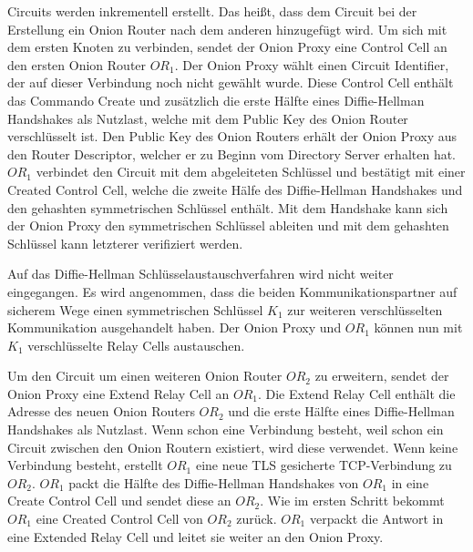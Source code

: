 \documentclass[fleqn,envcountsame,runningheads,10pt,a4paper]{llncs}
\begin{document}
Circuits werden inkrementell erstellt. Das heißt, dass dem Circuit bei der 
Erstellung ein Onion Router nach dem anderen hinzugefügt wird. Um sich mit dem 
ersten Knoten zu verbinden, sendet der Onion Proxy eine Control Cell an den 
ersten Onion Router $\textit{OR}_1$. Der Onion Proxy wählt einen Circuit 
Identifier, der auf dieser Verbindung noch nicht gewählt wurde. Diese Control 
Cell enthält das Commando Create und zusätzlich die erste Hälfte eines 
Diffie-Hellman Handshakes als Nutzlast, welche mit dem Public Key des Onion 
Router verschlüsselt ist. Den Public Key des Onion Routers erhält der Onion 
Proxy aus den Router Descriptor, welcher er zu Beginn vom Directory Server 
erhalten hat. $\textit{OR}_1$ verbindet den Circuit mit dem abgeleiteten 
Schlüssel und  bestätigt mit einer Created Control Cell, welche die zweite Hälfe 
des Diffie-Hellman Handshakes und den gehashten symmetrischen Schlüssel enthält. 
Mit dem Handshake kann sich der Onion Proxy den symmetrischen Schlüssel ableiten 
und mit dem gehashten Schlüssel kann letzterer verifiziert werden.

Auf das Diffie-Hellman Schlüsselaustauschverfahren \cite{dh} wird nicht weiter 
eingegangen. Es wird angenommen, dass die beiden Kommunikationspartner auf 
sicherem Wege einen symmetrischen Schlüssel $K_1$ zur weiteren verschlüsselten 
Kommunikation ausgehandelt haben. Der Onion Proxy und $\textit{OR}_1$ können nun 
mit $K_1$ verschlüsselte Relay Cells austauschen. 

Um den Circuit um einen weiteren Onion Router $\textit{OR}_2$ zu erweitern, 
sendet der Onion Proxy eine Extend Relay Cell an $\textit{OR}_1$. Die Extend 
Relay Cell enthält die Adresse des neuen Onion Routers $\textit{OR}_2$ und die 
erste Hälfte eines Diffie-Hellman Handshakes als Nutzlast. Wenn schon eine 
Verbindung besteht, weil schon ein Circuit zwischen den Onion Routern existiert, 
wird diese verwendet. Wenn keine Verbindung besteht, erstellt $\textit{OR}_1$ 
eine neue TLS\cite{rfc:tls} gesicherte TCP-Verbindung zu $\textit{OR}_2$. 
$\textit{OR}_1$ packt die Hälfte des Diffie-Hellman Handshakes von 
$\textit{OR}_1$ in eine Create Control Cell und sendet diese an $\textit{OR}_2$. 
Wie im ersten Schritt bekommt $\textit{OR}_1$ eine Created Control Cell von 
$\textit{OR}_2$ zurück. $\textit{OR}_1$ verpackt die Antwort in eine Extended 
Relay Cell und leitet sie weiter an den Onion Proxy.
\end{document}
